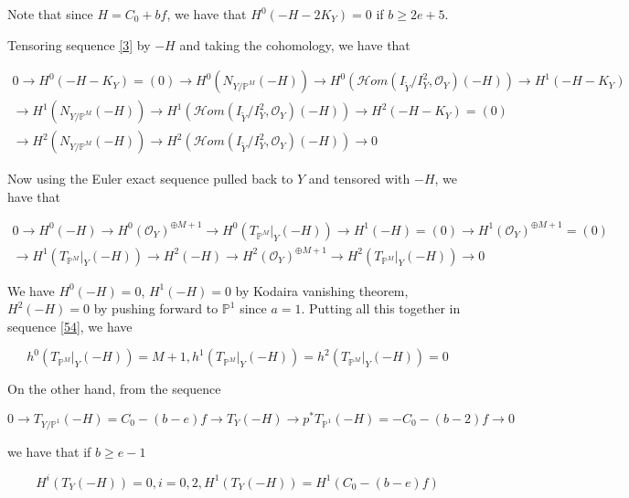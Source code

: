 \documentclass[11pt,twoside]{amsart}
\theoremstyle{plain}
\numberwithin{equation}{section}
\theoremstyle{definition}
\begin{document}
Note that since $H = C_0+bf$, we have that $H^0(-H-2K_Y) = 0$ if $b \geq 2e+5$.

Tensoring sequence \ref{3} by $-H$ and taking the cohomology, we have that 

\begin{multline}\label{53}
 0 \to H^0(-H-K_Y) = (0) \to H^0(N_{Y/\mathbb{P}^M}(-H)) \to H^0(\mathcal{H}om(I_{\widetilde{Y}}/I_{Y}^2, \mathcal{O}_Y)(-H)) \to H^1(-H-K_Y)  \\ \to H^1(N_{Y/\mathbb{P}^M}(-H)) \to H^1(\mathcal{H}om(I_{\widetilde{Y}}/I_{Y}^2, \mathcal{O}_Y)(-H)) \to H^2(-H-K_Y) = (0) \\ \to
 H^2(N_{Y/\mathbb{P}^M}(-H)) \to H^2(\mathcal{H}om(I_{\widetilde{Y}}/I_{Y}^2, \mathcal{O}_Y)(-H)) \to 0
\end{multline}

Now using the Euler exact sequence pulled back to $Y$  and tensored with $-H$, we have that 

\begin{multline}\label{54}
 0 \to H^0(-H) \to H^0(\mathcal{O}_Y)^{\oplus M+1} \to H^0(T_{\mathbb{P}^M}|_Y (-H)) \to H^1(-H) = (0) \to H^1(\mathcal{O}_Y)^{\oplus M+1} = (0) \\ \to H^1(T_{\mathbb{P}^M}|_Y (-H)) \to H^2(-H) \to H^2(\mathcal{O}_Y)^{\oplus M+1} \to H^2(T_{\mathbb{P}^M}|_Y (-H)) \to 0   
\end{multline}

We have $H^0(-H) = 0$, $H^1(-H) = 0$ by Kodaira vanishing theorem, $H^2(-H) = 0$ by pushing forward to $\mathbb{P}^1$  since $a = 1$.  Putting all this together in sequence \ref{54}, we have

\begin{equation}\label{55}
  h^0(T_{\mathbb{P}^M}|_Y (-H)) = M+1, h^1(T_{\mathbb{P}^M}|_Y (-H)) = h^2(T_{\mathbb{P}^M}|_Y (-H)) = 0 
\end{equation}

On the other hand, from the sequence 

\begin{equation}
    0 \to T_{Y/\mathbb{P}^1}(-H) = C_0-(b-e)f \to T_Y(-H) \to p^*T_{\mathbb{P}^1}(-H) = -C_0-(b-2)f \to 0
\end{equation}

we have that if $b \geq e-1$

\begin{equation}\label{56}
    H^{i}(T_Y(-H)) = 0, i = 0,2, H^1(T_Y(-H)) = H^1(C_0-(b-e)f)
\end{equation}
\end{document}
